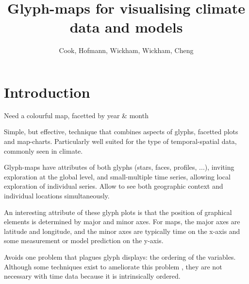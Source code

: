 \documentclass[oneside]{article}
\begin{document}
\title{Glyph-maps for visualising climate data and models}
\author{Cook, Hofmann, Wickham, Wickham, Cheng}

%
%
\maketitle

\section{Introduction}

Need a colourful map, facetted by year \& month

Simple, but effective, technique that combines aspects of glyphs, facetted plots and map-charts. Particularly well suited for the type of temporal-spatial data, commonly seen in climate.

Glyph-maps have attributes of both glyphs (stars, faces, profiles, ...), inviting exploration at the global level, and small-multiple time series, allowing local exploration of individual series. Allow to see both geographic context and individual locations simultaneously.

An interesting attribute of these glyph plots is that the position of graphical elements is determined by major and minor axes. For maps, the major axes are latitude and longitude, and the minor axes are typically time on the x-axis and some measurement or model prediction on the y-axis.

Avoids one problem that plagues glyph displays: the ordering of the variables. Although some techniques exist to ameliorate this problem \citep{kleiner:1981,hurley:2010}, they are not necessary with time data because it is intrinsically ordered.
\end{document}
